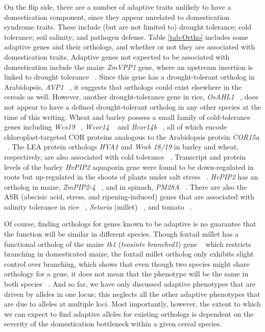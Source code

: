 \documentclass[12pt]{article}
\begin{document}
On the flip side, there are a number of adaptive traits unlikely to have a domestication component, since they appear unrelated to domestication syndrome traits. These include (but are not limited to) drought tolerance; cold tolerance; soil salinity; and pathogen defense.  Table \ref{tab:Ortho} includes some adaptive genes and their orthologs, and whether or not they are associated with domestication traits.  Adaptive genes not expected to be associated with domestication include the maize \textit{ZmVPP1} gene, where an upstream insertion is linked to drought tolerance ~\citep{Wang2016}.  Since this gene has a drought-tolerant ortholog in Arabidopsis, \textit{AVP1} ~\citep{Gaxiola2001}, it suggests that orthologs could exist elsewhere in the cereals as well. However, another drought-tolerance gene in rice, \textit{OsAHL1} ~\citep{Zhou2016}, does not appear to have a defined drought-tolerant ortholog in any other species at the time of this writing. Wheat and barley possess a small family of cold-tolerance genes including \textit{Wcs19} ~\citep{pmid8219063}, \textit{Wcor14} ~\citep{pmid10846621} and \textit{Bcor14b} ~\citep{pmid9952464}, all of which encode chloroplast-targeted COR proteins analogous to the Arabidopsis protein \textit{COR15a}  ~\citep{pmid9826741, Takumi2003}. The LEA protein orthologs \textit{HVA1} and \textit{Wrab 18/19} in barley and wheat, respectively, are also associated with cold tolerance ~\citep{Hong1988, pmid16755132}. Transcript and protein levels of the barley \textit{HvPIP2} aquaporin gene were found to be down-regulated in roots but up-regulated in the shoots of plants under salt stress ~\citep{Katsuhara2002}.  \textit{HvPIP2} has an ortholog in maize, \textit{ZmPIP2-4} ~\citep{Zhu2005}, and in spinach, \textit{PM28A} ~\citep{Fotiadis2000}. There are also the ASR (abscisic acid, stress, and ripening-induced) genes that are associated with salinity tolerance in rice ~\citep{Joo2013}, \textit{Setaria} (millet) ~\citep{Li2017}, and tomato ~\citep{Konrad2008}. 

Of course, finding orthologs for genes known to be adaptive is no guarantee that the function will be similar in different species. Though foxtail millet has a functional ortholog of the maize \textit{tb1} (\textit{teosinte branched1}) gene ~\citep{pmid9087405}  which restricts branching in domesticated maize, the foxtail millet ortholog only exhibits slight control over branching, which shows that even though two species might share orthology for a gene, it does not mean that the phenotype will be the same in both species ~\citep{Doust2004}. And so far, we have only discussed adaptive phenotypes that are driven by alleles in one locus; this neglects all the other adaptive phenotypes that are due to alleles at multiple loci.  Most importantly, however, the extent to which we can expect to find adaptive alleles for existing orthologs is dependent on the severity of the domestication bottleneck within a given cereal species.
\end{document}
